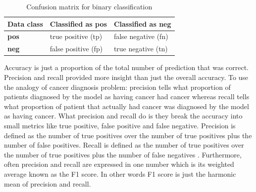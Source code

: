 \begin{table}[ht]
	\centering
	\caption{Confusion matrix for binary classification }
	\label{table:Confusion matrix}
	\begin{tabular}{|p{3cm}|p{4cm}|p{4cm}|} 
		\hline
		\textbf{Data class} & \textbf{Classified as pos}& \textbf{Classified as neg}\\ 
		\hline %
		\textbf{pos} & true positive (tp) & false negative (fn) \\ 
		\textbf{neg} & false positive (fp) & true negative (tn)  \\ 
		
		
		\hline		
	\end{tabular} %
	
\end{table} %


Accuracy is just a proportion of the total number of prediction that was correct. Precision and recall provided more insight than just the overall accuracy. To use the analogy of cancer diagnosis problem: precision tells what proportion of patients diagnosed by the model as having cancer had cancer whereas recall tells what proportion of patient that actually had cancer was diagnosed by the model as having cancer. What precision and recall do is they break the accuracy into small metrics like true positive, false positive and false negative. Precision is defined as the number of true positives over the number of true positives plus the number of false positives. Recall is defined as the number of true positives over the number of true positives plus the number of false negatives \citep{scikit-learn}. Furthermore, often precision and recall are expressed in one number which is its weighted average known as the F1 score. In other words F1 score is just the harmonic mean of precision and recall.

